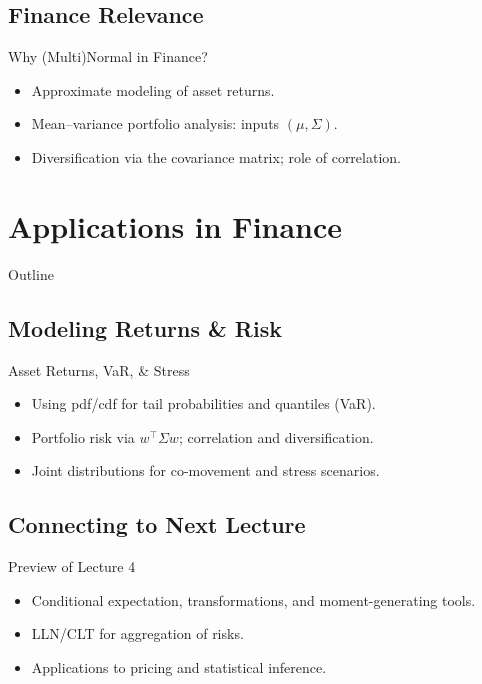\documentclass[aspectratio=169]{beamer}
\begin{document}
\subsection{Finance Relevance}
\begin{frame}{Why (Multi)Normal in Finance?}
\begin{itemize}
  \item Approximate modeling of asset returns.
  \item Mean–variance portfolio analysis: inputs \((\mu,\Sigma)\).
  \item Diversification via the covariance matrix; role of correlation.
\end{itemize}
\end{frame}

\section{Applications in Finance}

\begin{frame}{Outline}
\end{frame}

\subsection{Modeling Returns \& Risk}
\begin{frame}{Asset Returns, VaR, \& Stress}
\begin{itemize}
  \item Using pdf/cdf for tail probabilities and quantiles (VaR).
  \item Portfolio risk via \(w^\top\Sigma w\); correlation and diversification.
  \item Joint distributions for co-movement and stress scenarios.
\end{itemize}
\end{frame}

\subsection{Connecting to Next Lecture}
\begin{frame}{Preview of Lecture 4}
\begin{itemize}
  \item Conditional expectation, transformations, and moment-generating tools.
  \item LLN/CLT for aggregation of risks.
  \item Applications to pricing and statistical inference.
\end{itemize}
\end{frame}
\end{document}
